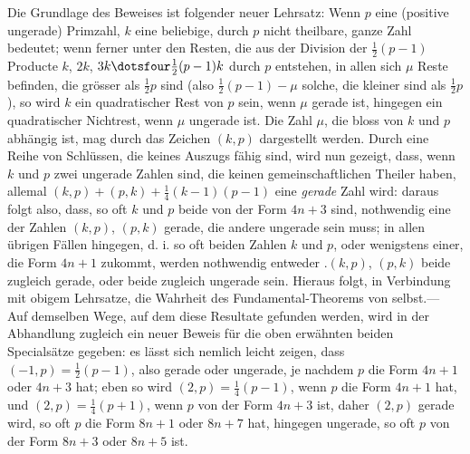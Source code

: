 Die Grundlage des Beweises ist folgender neuer Lehrsatz: Wenn $p$ eine (positive ungerade) Primzahl, $k$ eine beliebige, durch $p$ nicht theilbare, ganze Zahl bedeutet; wenn ferner unter den Resten, die aus der Division der $\frac12(p-1)$ Producte $k$, $2k$, $3k\dotsfour\frac12(p-1)k$ durch $p$ entstehen, in allen sich $\mu$ Reste befinden, die grösser als $\frac12p$ sind (also $\frac12(p-1)-\mu$ solche, die kleiner sind als $\frac12p$), so wird $k$ ein quadratischer Rest von $p$ sein, wenn $\mu$ gerade ist, hingegen ein quadratischer Nichtrest, wenn $\mu$ ungerade ist. Die Zahl $\mu$, die bloss von $k$
%
und $p$ abhängig ist, mag durch das Zeichen $(k,p)$ dargestellt werden. Durch eine Reihe von Schlüssen, die keines Auszugs fähig sind, wird nun gezeigt, dass, wenn $k$ und $p$ zwei ungerade Zahlen sind, die keinen gemeinschaftlichen Theiler haben, allemal $(k,p)+(p,k)+\frac14(k-1)(p-1)$ eine \emph{gerade} Zahl wird: daraus folgt also, dass, so oft $k$ und $p$ beide von der Form $4n+3$ sind, nothwendig eine der Zahlen $(k,p)$, $(p,k)$ gerade, die andere ungerade sein muss; in allen übrigen Fällen hingegen, d. i. so oft beiden Zahlen $k$ und $p$, oder wenigstens einer, die Form $4n+1$ zukommt, werden nothwendig entweder .$(k,p)$, $(p,k)$ beide zugleich gerade, oder beide zugleich ungerade sein. Hieraus folgt, in Verbindung mit obigem Lehrsatze, die Wahrheit des Fundamental-Theorems von selbst.--- Auf demselben Wege, auf dem diese Resultate gefunden werden, wird in der Abhandlung zugleich ein neuer Beweis für die oben erwähnten beiden Specialsätze gegeben: es lässt sich nemlich leicht zeigen, dass $(-1,p)=\frac12(p-1)$, also gerade oder ungerade, je nachdem $p$ die Form $4n+1$ oder $4n+3$ hat; eben so wird $(2,p)=\frac14(p-1)$, wenn $p$ die Form $4n+1$ hat, und $(2,p)=\frac14(p+1)$, wenn $p$ von der Form $4n+3$ ist, daher $(2,p)$ gerade wird, so oft $p$ die Form $8n+1$ oder $8n+7$ hat, hingegen ungerade, so oft $p$ von der Form $8n+3$ oder $8n+5$ ist.

